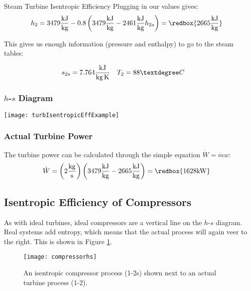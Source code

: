 \begin{example}[label=ex:isentropicEffTurbine]{Steam Turbine Isentropic Efficiency}
  Plugging in our values gives:
  \begin{equation*}
    h_2 = 3479 \frac{\rm kJ}{\rm kg} - 0.8 \left( 3479 \frac{\rm kJ}{\rm kg} - 2461 \frac{\rm kJ}{\rm kg} h_{2s} \right) = \redbox{ 2665 \frac{\rm kJ}{\rm kg}}
  \end{equation*}

  This gives us enough information (pressure and enthalpy) to go to the steam tables:

  \begin{align*}
    s_{2s} &= 7.764 \frac{\rm kJ}{\rm kg\,K} & T_{2} &= 88°C
  \end{align*}


  \subsubsection*{$h$-$s$ Diagram}
  \begin{center}
    \texttt{[image: turbIsentropicEffExample]}
  \end{center}
  
  \subsubsection*{Actual Turbine Power}
  The turbine power can be calculated through the simple equation $\dot{W} = \dot{m} w$:
  \begin{equation*}
    \dot{W} = \left(2 \frac{\rm kg}{\rm s}\right) \left(3479 \frac{\rm kJ}{\rm kg} - 2665 \frac{\rm kJ}{\rm kg}\right) = \redbox{1628 \rm kW}
  \end{equation*}
  
\end{example}

\subsection{Isentropic Efficiency of Compressors} \label{sec:compressor_eff}

As with ideal turbines, ideal compressors are a vertical line on the $h$-$s$ diagram.  Real systems add entropy, which means that the actual process will again veer to the right.  This is shown in Figure \ref{fig:compressor_eff}.

\begin{figure}[H]
  \centering
  \texttt{[image: compressorhs]}
  \caption{An isentropic compressor process (1-2s) shown next to an actual turbine process (1-2).}
  \label{fig:compressor_eff}
\end{figure}

